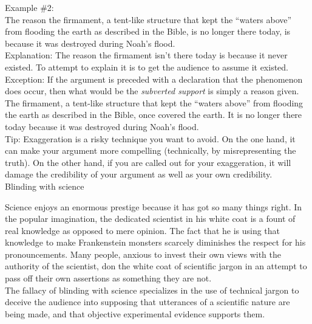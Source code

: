 \documentclass[a4paper,12pt,single,pdftex]{scrartcl}
\begin{document}
    
      Example \#2:
    \\

    
      The reason the firmament, a tent-like structure that kept the “waters above” from flooding the earth as described in the Bible, is no longer there today, is because it was destroyed during Noah’s flood.
    \\

    
      Explanation: The reason the firmament isn’t there today is because it never existed.  To attempt to explain it is to get the audience to assume it existed.
    \\

    
      Exception: If the argument is preceded with a declaration that the phenomenon does occur, then what would be the {\it subverted support }is simply a reason given.
    \\

    
      The firmament, a tent-like structure that kept the “waters above” from flooding the earth as described in the Bible, once covered the earth.  It is no longer there today because it was destroyed during Noah’s flood.
    \\

    
      Tip: Exaggeration is a risky technique you want to avoid. On the one hand, it can make your argument more compelling (technically, by misrepresenting the truth). On the other hand, if you are called out for your exaggeration, it will damage the credibility of your argument as well as your own credibility.
    \\

  

Blinding with science
    
      Science enjoys an enormous prestige because it has got so many things right. In the popular imagination, the dedicated scientist in his white coat is a fount of real knowledge as opposed to mere opinion. The fact that he is using that knowledge to make Frankenstein monsters scarcely diminishes the respect for his pronouncements. Many people, anxious to invest their own views with the authority of the scientist, don the white coat of scientific jargon in an attempt to pass off their own assertions as something they are not.
    \\

    
      The fallacy of blinding with science specializes in the use of technical jargon to deceive the audience into supposing that utterances of a scientific nature are being made, and that objective experimental evidence supports them.
    \\
\end{document}
